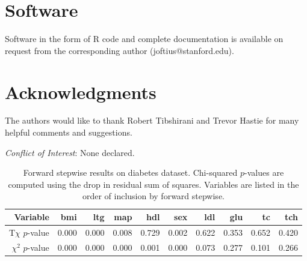 \documentclass[oupdraft]{bio}
\begin{document}
\section{Software}
\label{sec5}

Software in the form of R code and complete documentation is available on request from the corresponding author (joftius@stanford.edu).





\section*{Acknowledgments}
The authors would like to thank Robert Tibshirani and Trevor Hastie for many helpful comments and suggestions.

{\it Conflict of Interest}: None declared.





\begin{table}[ht]
\centering
\begin{tabular}{r|rrrrrrrrr}
  \hline
Variable & bmi & ltg & map & hdl & sex & ldl & glu & tc & tch \\ 
  \hline
T$\chi$ $p$-value & 0.000 & 0.000 & 0.008 & 0.729 & 0.002 & 0.622 & 0.353 & 0.652 & 0.420 \\ 
$\chi^2$ $p$-value & 0.000 & 0.000 & 0.000 & 0.001 & 0.000 & 0.073 & 0.277 & 0.101 & 0.266 \\ 
   \hline
\end{tabular}
\caption{Forward stepwise results on diabetes dataset. Chi-squared $p$-values are computed using the drop in residual sum of squares. Variables are listed in the order of inclusion by forward stepwise.} 
\label{tab:diabetes}
\end{table}
\end{document}
